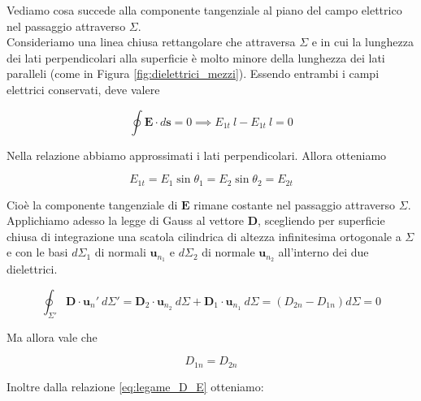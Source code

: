 Vediamo cosa succede alla componente tangenziale al piano del campo elettrico nel passaggio attraverso $\Sigma$.\\

Consideriamo una linea chiusa rettangolare che attraversa $\Sigma$ e in cui la lunghezza dei lati perpendicolari alla superficie è molto minore della lunghezza dei lati paralleli (come in Figura \ref{fig:dielettrici_mezzi}). Essendo entrambi i campi elettrici conservati, deve valere

\begin{equation}
    \oint \mathbf{E} \cdot d \mathbf{s} = 0 \implies E_{1t} \ l - E_{1t} \ l = 0
\end{equation}

Nella relazione abbiamo approssimati i lati perpendicolari. Allora otteniamo 

\begin{tcolorbox}[colback=yellow!10!white, colframe=orange!70!black, boxrule=0.8pt]
\begin{equation}
    E_{1t} = E_1 \sin \theta_1 = E_2 \sin \theta_2 = E_{2t}
\end{equation}
\end{tcolorbox}

Cioè la componente tangenziale di $\mathbf{E}$ rimane costante nel passaggio attraverso $\Sigma$. \\


Applichiamo adesso la legge di Gauss al vettore $\mathbf{D}$, scegliendo per superficie chiusa di integrazione una scatola cilindrica di altezza infinitesima ortogonale a $\Sigma$ e con le basi $d \Sigma_1$ di normali $\mathbf{u}_{n_1}$ e $d \Sigma_2$ di normale $\mathbf{u}_{n_2}$ all'interno dei due dielettrici. 

\begin{equation}
    \oint_{\Sigma'} \mathbf{D} \cdot \mathbf{u}_n ' \ d \Sigma ' = \mathbf{D}_2 \cdot \mathbf{u}_{n_2} \ d \Sigma + \mathbf{D}_1 \cdot \mathbf{u}_{n_1} \ d \Sigma = (D_{2n} - D_{1n}) d\Sigma = 0 
\end{equation}

Ma allora vale che 

\begin{tcolorbox}[colback=yellow!10!white, colframe=orange!70!black, boxrule=0.8pt]
\begin{equation}
    D_{1n} = D_{2n}
\end{equation}
\end{tcolorbox}

Inoltre dalla relazione \ref{eq:legame_D_E} otteniamo:

